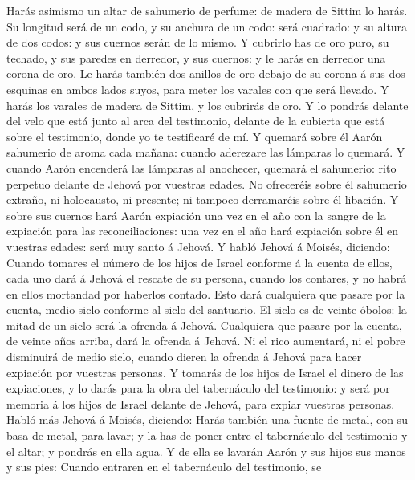  Harás asimismo un altar de sahumerio de perfume: de madera
de Sittim lo harás.  Su longitud será de un codo, y su
anchura de un codo: será cuadrado: y su altura de dos codos: y sus
cuernos serán de lo mismo.  Y cubrirlo has de oro puro, su
techado, y sus paredes en derredor, y sus cuernos: y le harás en
derredor una corona de oro.  Le harás también dos anillos de
oro debajo de su corona á sus dos esquinas en ambos lados suyos, para
meter los varales con que será llevado.  Y harás los varales
de madera de Sittim, y los cubrirás de oro.  Y lo pondrás
delante del velo que está junto al arca del testimonio, delante de la
cubierta que está sobre el testimonio, donde yo te testificaré de mí.
 Y quemará sobre él Aarón sahumerio de aroma cada mañana:
cuando aderezare las lámparas lo quemará.  Y cuando Aarón
encenderá las lámparas al anochecer, quemará el sahumerio: rito perpetuo
delante de Jehová por vuestras edades.  No ofreceréis sobre
él sahumerio extraño, ni holocausto, ni presente; ni tampoco derramaréis
sobre él libación.  Y sobre sus cuernos hará Aarón
expiación una vez en el año con la sangre de la expiación para las
reconciliaciones: una vez en el año hará expiación sobre él en vuestras
edades: será muy santo á Jehová.  Y habló Jehová á Moisés,
diciendo:  Cuando tomares el número de los hijos de Israel
conforme á la cuenta de ellos, cada uno dará á Jehová el rescate de su
persona, cuando los contares, y no habrá en ellos mortandad por haberlos
contado.  Esto dará cualquiera que pasare por la cuenta,
medio siclo conforme al siclo del santuario. El siclo es de veinte
óbolos: la mitad de un siclo será la ofrenda á Jehová. 
Cualquiera que pasare por la cuenta, de veinte años arriba, dará la
ofrenda á Jehová.  Ni el rico aumentará, ni el pobre
disminuirá de medio siclo, cuando dieren la ofrenda á Jehová para hacer
expiación por vuestras personas.  Y tomarás de los hijos de
Israel el dinero de las expiaciones, y lo darás para la obra del
tabernáculo del testimonio: y será por memoria á los hijos de Israel
delante de Jehová, para expiar vuestras personas.  Habló
más Jehová á Moisés, diciendo:  Harás también una fuente de
metal, con su basa de metal, para lavar; y la has de poner entre el
tabernáculo del testimonio y el altar; y pondrás en ella agua.
 Y de ella se lavarán Aarón y sus hijos sus manos y sus
pies:  Cuando entraren en el tabernáculo del testimonio, se
